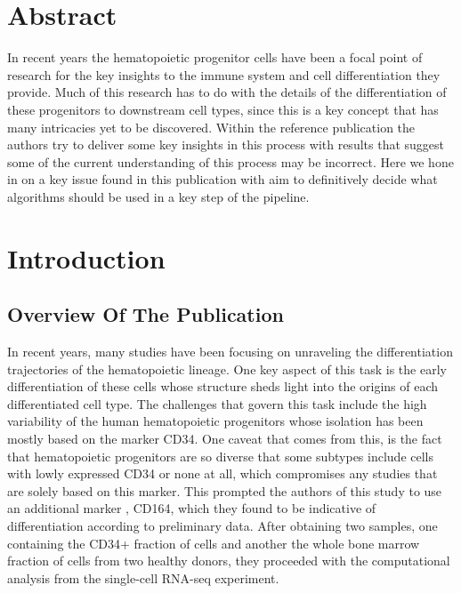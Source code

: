 \documentclass[12pt, a4paper]{article}
\begin{document}
    \begin{multicols}{2}

        \section{Abstract} \label{sec:Abs}

            In recent years the hematopoietic progenitor cells have been a focal point of research for the key insights to the immune system and cell differentiation they provide. Much of this research has to do with the details of the differentiation of these progenitors to downstream cell types, since this is a key concept that has many intricacies yet to be discovered. Within the reference publication the authors try to deliver some key insights in this process with results that suggest some of the current understanding of this process may be incorrect. Here we hone in on a key issue found in this publication with aim to definitively decide what algorithms should be used in a key step of the pipeline.


        \section{Introduction} \label{sec:Intro}

            \subsection{Overview Of The Publication}\label{sub:Overview Of The Publication} %

				In recent years, many studies have been focusing on unraveling the differentiation trajectories of the hematopoietic lineage.
                One key aspect of this task is the early differentiation of these cells whose structure sheds light into the origins of each differentiated cell type.
                The challenges that govern this task include the high variability of the human hematopoietic progenitors whose isolation has been mostly based on the marker CD34.
                One caveat that comes from this, is the fact that hematopoietic progenitors are so diverse that some subtypes include cells with lowly expressed CD34 or none at all, which compromises any studies that are solely based on this marker.
                This prompted the authors of this study to use an additional marker , CD164, which they found to be indicative of differentiation according to preliminary data.
                After obtaining two samples, one containing the CD34+ fraction of cells and another the whole bone marrow fraction of cells from two healthy donors, they proceeded with the computational analysis from the single-cell RNA-seq experiment.
                \newline


\end{multicols}
\end{document}
